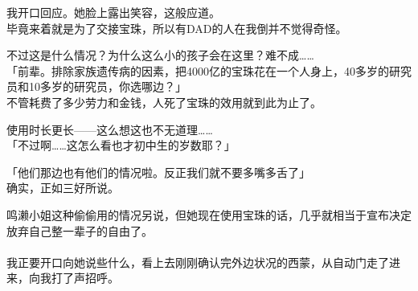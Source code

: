 我开口回应。她脸上露出笑容，这般应道。\\

毕竟来着就是为了交接宝珠，所以有DAD的人在我倒并不觉得奇怪。

不过这是什么情况？为什么这么小的孩子会在这里？难不成……\\

「前辈。排除家族遗传病的因素，把4000亿的宝珠花在一个人身上，40多岁的研究员和10多岁的研究员，你选哪边？」\\

不管耗费了多少劳力和金钱，人死了宝珠的效用就到此为止了。

使用时长更长——这么想这也不无道理……\\

「不过啊……这怎么看也才初中生的岁数耶？」

「他们那边也有他们的情况啦。反正我们就不要多嘴多舌了」\\

确实，正如三好所说。

鸣濑小姐这种偷偷用的情况另说，但她现在使用宝珠的话，几乎就相当于宣布决定放弃自己整一辈子的自由了。\\

\\

我正要开口向她说些什么，看上去刚刚确认完外边状况的西蒙，从自动门走了进来，向我打了声招呼。\\

